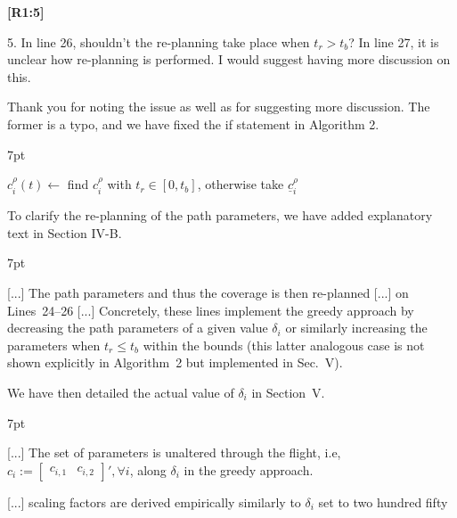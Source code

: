 \documentclass[10pt]{letter}
\newenvironment{formal}{%
  \def\FrameCommand{%
    \hspace{1pt}%
    {\color{red}\vrule width 2pt}%
    {\color{formalshade}\vrule width 4pt}%
    \colorbox{formalshade}%
  }%
  \MakeFramed{\advance\hsize-\width\FrameRestore}%
  \noindent\hspace{-4.55pt}%
  \begin{adjustwidth}{}{7pt}%
  \vspace{2pt}\vspace{2pt}%
}
{%
  \vspace{2pt}\end{adjustwidth}\endMakeFramed%
}
\begin{document}
{\hspace*{-4.5em}\textbf{[R1:5]}\vspace*{-1.9em}}

5. In line 26, shouldn’t the re-planning take place when $t_r>t_b$? In line 27, it is unclear how
re-planning is performed. I would suggest having more discussion on this.

{\hspace*{-4.5em}{[R1:5]}\vspace*{-1.9em}}

{\color{blue} 

{\hspace*{-4.5em}{[R1:5]}\vspace*{-1.9em}}

Thank you for noting the issue as well as for suggesting more discussion. The former is a typo, and we have fixed the if statement in Algorithm 2.

\begin{formal}
  \begin{algorithmic}[1]
    \small
      \makeatletter
      \setcounter{ALC@line}{24}
      \makeatother
        \color{blue}\STATE $c_i^{\rho}(t)\gets${ find }$c_i^{\rho}${ with }$t_r\in[0,t_b]${, otherwise take }$\underline{c}_i^\rho$\vspace*{.3ex}\label{alg:traj2}
      \color{black}\ENDIF
      \vspace*{.8ex}
    \end{algorithmic}
  \end{formal}  

  To clarify the re-planning of the path parameters, we have added explanatory text in Section IV-B.

  \begin{formal}
    \color{black} [...] The {\color{blue}path parameters and thus the} coverage is then re{\color{blue}-}planned [...] on Lines~{\color{red}24}--{\color{red}26} [...] {\color{blue}Concretely, these lines implement the greedy approach by decreasing the path parameters of a given value $\delta_i$ or similarly increasing the parameters when $t_r\leq t_b$ within the bounds (this latter analogous case is not shown explicitly in Algorithm~{\color{red}2} but implemented in Sec.~{\color{red}V})}.
    \vspace*{1ex}
  \end{formal}

  We have then detailed the actual value of $\delta_i$ in Section~V.

  \begin{formal}
    \color{black} [...] The set of parameters is unaltered through the flight, i.e, $c_i:=\begin{bmatrix}c_{i,1}&c_{i,2}\end{bmatrix}',\forall i${\color{blue}, along $\delta_i$ %
    in the greedy approach}.
    
    [...] scaling factors are derived empirically %
    {\color{blue}similarly to $\delta_i$ set to two hundred fifty}
    \vspace*{1ex}
  \end{formal}
}
\end{document}
